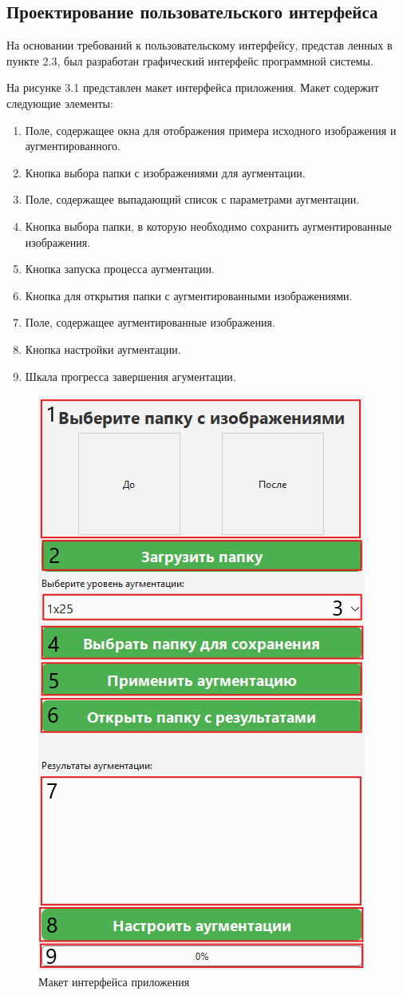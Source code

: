 \subsection{Проектирование пользовательского интерфейса}

На основании требований к пользовательскому интерфейсу, представ
ленных в пункте 2.3, был разработан графический интерфейс программной
системы.

На рисунке 3.1 представлен макет интерфейса приложения. Макет содержит следующие элементы:

\begin{enumerate}
	\item Поле, содержащее окна для отображения примера исходного изображения и аугментированного.
	\item Кнопка выбора папки с изображениями для аугментации.
	\item Поле, содержащее выпадающий список с параметрами аугментации.
	\item Кнопка выбора папки, в которую необходимо сохранить аугментированные изображения.
	\item Кнопка запуска процесса аугментации.
	\item Кнопка для открытия папки с аугментированными изображениями.
	\item Поле, содержащее аугментированные изображения.
	\item Кнопка настройки аугментации.
	\item Шкала прогресса завершения агументации.
\end{enumerate}


\begin{figure}
	\centering
	\includegraphics[width=0.4\linewidth]{images/interfacenum}
	\caption{Макет интерфейса приложения}
	\label{fig:interfacenum}
\end{figure}
